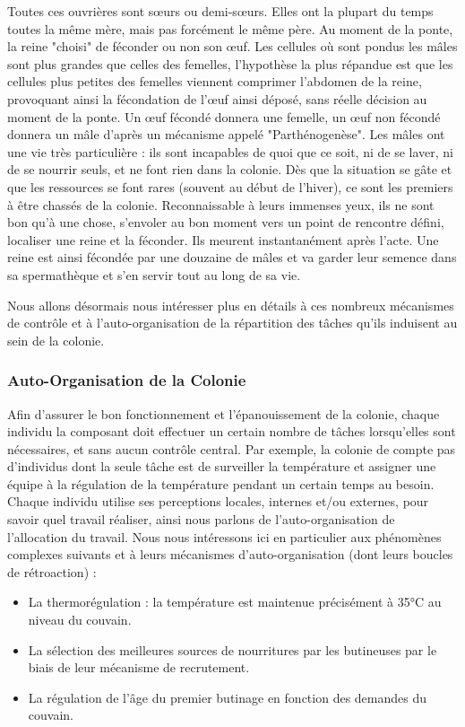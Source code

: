 			Toutes ces ouvrières sont sœurs ou demi-sœurs. Elles ont la plupart du temps toutes la même mère, mais pas forcément le même père. Au moment de la ponte, la reine "choisi" de féconder ou non son œuf. Les cellules où sont pondus les mâles sont plus grandes que celles des femelles, l'hypothèse la plus répandue est que les cellules plus petites des femelles viennent comprimer l'abdomen de la reine, provoquant ainsi la fécondation de l'œuf ainsi déposé, sans réelle décision au moment de la ponte. Un œuf fécondé donnera une femelle, un œuf non fécondé donnera un mâle d'après un mécanisme appelé "Parthénogenèse". 
			Les mâles ont une vie très particulière : ils sont incapables de quoi que ce soit, ni de se laver, ni de se nourrir seuls, et ne font rien dans la colonie. Dès que la situation se gâte et que les ressources se font rares (souvent au début de l'hiver), ce sont les premiers à être chassés de la colonie. Reconnaissable à leurs immenses yeux, ils ne sont bon qu'à une chose, s'envoler au bon moment vers un point de rencontre défini, localiser une reine et la féconder. Ils meurent instantanément après l'acte. Une reine est ainsi fécondée par une douzaine de mâles et va garder leur semence dans sa spermathèque et s'en servir tout au long de sa vie.
			
			Nous allons désormais nous intéresser plus en détails à ces nombreux mécanismes de contrôle et à l'auto-organisation de la répartition des tâches qu'ils induisent au sein de la colonie.
			
		\subsubsection{Auto-Organisation de la Colonie}
			Afin d'assurer le bon fonctionnement et l'épanouissement de la colonie, chaque individu la composant doit effectuer un certain nombre de tâches lorsqu'elles sont nécessaires, et sans aucun contrôle central. Par exemple, la colonie de compte pas d'individus dont la seule tâche est de surveiller la température et assigner une équipe à la régulation de la température pendant un certain temps au besoin. Chaque individu utilise ses perceptions locales, internes et/ou externes, pour savoir quel travail réaliser, ainsi nous parlons de l'auto-organisation de l'allocation du travail. Nous nous intéressons ici en particulier aux phénomènes complexes suivants et à leurs mécanismes d'auto-organisation (dont leurs boucles de rétroaction) :
			
			
			\begin{itemize}
				\item La thermorégulation : la température est maintenue précisément à 35°C au niveau du couvain.
				\item La sélection des meilleures sources de nourritures par les butineuses par le biais de leur mécanisme de recrutement.
				\item La régulation de l'âge du premier butinage en fonction des demandes du couvain.
			\end{itemize}

